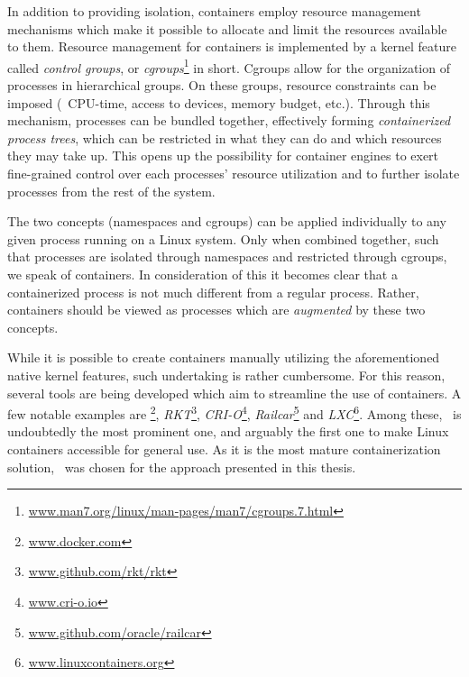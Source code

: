 In addition to providing isolation, containers employ resource management mechanisms which make it possible to allocate and limit the resources available to them. Resource management for containers is implemented by a kernel feature called \emph{control groups}, or \emph{cgroups}\footnote{\url{www.man7.org/linux/man-pages/man7/cgroups.7.html}} in short. Cgroups allow for the organization of processes in hierarchical groups. On these groups, resource constraints can be imposed (\eg\ CPU-time, access to devices, memory budget, etc.). 
Through this mechanism, processes can be bundled together, effectively forming \emph{containerized process trees}, which can be restricted in what they can do and which resources they may take up. This opens up the possibility for container engines to exert fine-grained control over each processes' resource utilization and to further isolate processes from the rest of the system.

The two concepts (namespaces and cgroups) can be applied individually to any given process running on a Linux system. Only when combined together, such that processes are isolated through namespaces and restricted through cgroups, we speak of containers. In consideration of this it becomes clear that a containerized process is not much different from a regular process. Rather, containers should be viewed as processes which are \emph{augmented} by these two concepts.


While it is possible to create containers manually utilizing the aforementioned native kernel features, such undertaking is rather cumbersome. For this reason, several tools are being developed which aim to streamline the use of containers. A few notable examples are \emph{\docker}\footnote{\url{www.docker.com}}, \emph{RKT}\footnote{\url{www.github.com/rkt/rkt}}, \emph{CRI-O}\footnote{\url{www.cri-o.io}}, \emph{Railcar}\footnote{\url{www.github.com/oracle/railcar}} and \emph{LXC}\footnote{\url{www.linuxcontainers.org}}. Among these,  \docker\ is undoubtedly the most prominent one, and arguably the first one to make Linux containers accessible for general use. As it is the most mature containerization solution, \docker\ was chosen for the approach presented in this thesis.


